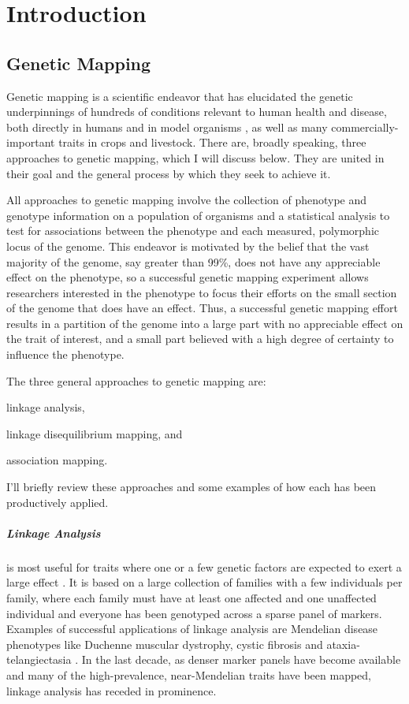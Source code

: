 \chapter{Introduction}

\section{Genetic Mapping}

Genetic mapping is a scientific endeavor that has elucidated the genetic underpinnings of hundreds of conditions relevant to human health and disease, both directly in humans \citep{MacArthur2017} and in model organisms \citep{Grubb2014a}, as well as many commercially-important traits in crops and livestock.
There are, broadly speaking, three approaches to genetic mapping, which I will discuss below.
They are united in their goal and the general process by which they seek to achieve it.

All approaches to genetic mapping involve the collection of phenotype and genotype information on a population of organisms and a statistical analysis to test for associations between the phenotype and each measured, polymorphic locus of the genome.
This endeavor is motivated by the belief that the vast majority of the genome, say greater than 99\%, does not have any appreciable effect on the phenotype, so a successful genetic mapping experiment allows researchers interested in the phenotype to focus their efforts on the small section of the genome that does have an effect.
Thus, a successful genetic mapping effort results in a partition of the genome into a large part with no appreciable effect on the trait of interest, and a small part believed with a high degree of certainty to influence the phenotype.

The three general approaches to genetic mapping are:
\begin{enumerate*}
	\item linkage analysis, 
	\item linkage disequilibrium mapping, and
	\item association mapping.
\end{enumerate*}
I'll briefly review these approaches and some examples of how each has been productively applied.


\paragraph{Linkage Analysis} is most useful for traits where one or a few genetic factors are expected to exert a large effect \citep{Elston1971,Haseman1972}.
It is based on a large collection of families with a few individuals per family, where each family must have at least one affected and one unaffected individual and everyone has been genotyped across a sparse panel of markers.
Examples of successful applications of linkage analysis are Mendelian disease phenotypes like Duchenne muscular dystrophy, \citep{Brown1985,Murray1982} cystic fibrosis \citep{Tsui1985,Wainwright1985,White1985} and ataxia-telangiectasia \citep{Gatti1988}.
In the last decade, as denser marker panels have become available and many of the high-prevalence, near-Mendelian traits have been mapped, linkage analysis has receded in prominence.
	

